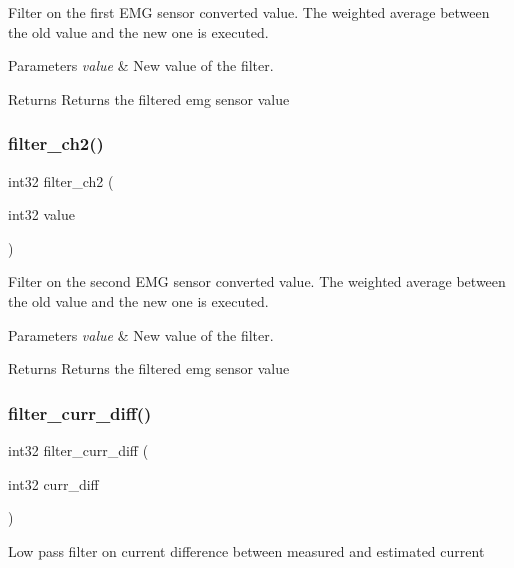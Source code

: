 Filter on the first E\+MG sensor converted value. The weighted average between the old value and the new one is executed.


\begin{DoxyParams}{Parameters}
{\em value} & New value of the filter.\\
\hline
\end{DoxyParams}
\begin{DoxyReturn}{Returns}
Returns the filtered emg sensor value 
\end{DoxyReturn}
\mbox{\label{utils_8h_a45f7702bcbea56e0d255f6a615e6b8ae}} 
\subsubsection{filter\+\_\+ch2()}
{\footnotesize\ttfamily int32 filter\+\_\+ch2 (\begin{DoxyParamCaption}\item[{int32}]{value }\end{DoxyParamCaption})}

Filter on the second E\+MG sensor converted value. The weighted average between the old value and the new one is executed.


\begin{DoxyParams}{Parameters}
{\em value} & New value of the filter.\\
\hline
\end{DoxyParams}
\begin{DoxyReturn}{Returns}
Returns the filtered emg sensor value 
\end{DoxyReturn}
\mbox{\label{utils_8h_a72883337efd7b70b783e426c47ecf689}} 
\subsubsection{filter\+\_\+curr\+\_\+diff()}
{\footnotesize\ttfamily int32 filter\+\_\+curr\+\_\+diff (\begin{DoxyParamCaption}\item[{int32}]{curr\+\_\+diff }\end{DoxyParamCaption})}

Low pass filter on current difference between measured and estimated current


